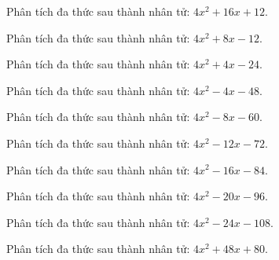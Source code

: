 \begin{bt}
	Phân tích đa thức sau thành nhân tử: $4 x^2 + 16 x + 12$.
\end{bt}
\begin{bt}
	Phân tích đa thức sau thành nhân tử: $4 x^2 + 8 x - 12$.
\end{bt}
\begin{bt}
	Phân tích đa thức sau thành nhân tử: $4 x^2 + 4 x - 24$.
\end{bt}
\begin{bt}
	Phân tích đa thức sau thành nhân tử: $4 x^2 - 4 x - 48$.
\end{bt}
\begin{bt}
	Phân tích đa thức sau thành nhân tử: $4 x^2 - 8 x - 60$.
\end{bt}
\begin{bt}
	Phân tích đa thức sau thành nhân tử: $4 x^2 - 12 x - 72$.
\end{bt}
\begin{bt}
	Phân tích đa thức sau thành nhân tử: $4 x^2 - 16 x - 84$.
\end{bt}
\begin{bt}
	Phân tích đa thức sau thành nhân tử: $4 x^2 - 20 x - 96$.
\end{bt}
\begin{bt}
	Phân tích đa thức sau thành nhân tử: $4 x^2 - 24 x - 108$.
\end{bt}
\begin{bt}
	Phân tích đa thức sau thành nhân tử: $4 x^2 + 48 x + 80$.
\end{bt}
